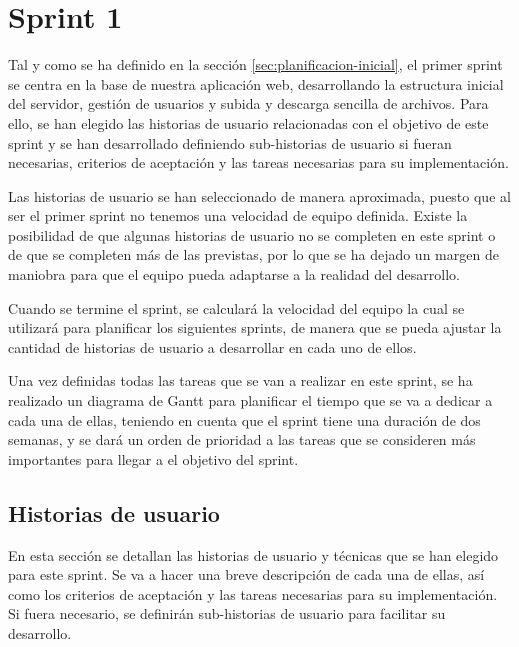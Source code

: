 \section{Sprint 1}
Tal y como se ha definido en la sección \ref{sec:planificacion-inicial}, el primer sprint se centra en la base de nuestra aplicación web, desarrollando la estructura inicial del servidor, gestión de usuarios y subida y descarga sencilla de archivos.
Para ello, se han elegido las historias de usuario relacionadas con el objetivo de este sprint y se han desarrollado definiendo sub-historias de usuario si fueran necesarias, criterios de aceptación y las tareas necesarias para su implementación.

Las historias de usuario se han seleccionado de manera aproximada, puesto que al ser el primer sprint no tenemos una velocidad de equipo definida. Existe la posibilidad de que algunas historias de usuario no se completen en este sprint o de que se completen más de las previstas, por lo que se ha dejado un margen de maniobra para que el equipo pueda adaptarse a la realidad del desarrollo.

Cuando se termine el sprint, se calculará la velocidad del equipo la cual se utilizará para planificar los siguientes sprints, de manera que se pueda ajustar la cantidad de historias de usuario a desarrollar en cada uno de ellos.

Una vez definidas todas las tareas que se van a realizar en este sprint, se ha realizado un diagrama de Gantt para planificar el tiempo que se va a dedicar a cada una de ellas, teniendo en cuenta que el sprint tiene una duración de dos semanas, y se dará un orden de prioridad a las tareas que se consideren más importantes para llegar a el objetivo del sprint.

\subsection{Historias de usuario}
En esta sección se detallan las historias de usuario y técnicas que se han elegido para este sprint. Se va a hacer una breve descripción de cada una de ellas, así como los criterios de aceptación y las tareas necesarias para su implementación. Si fuera necesario, se definirán sub-historias de usuario para facilitar su desarrollo.

